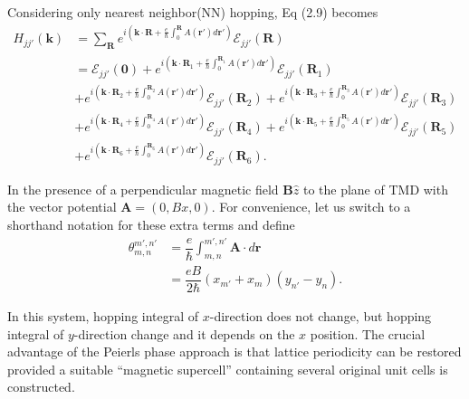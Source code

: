 \documentclass{report}
\newcommand{\f}[2]{\dfrac{#1}{#2}}
\begin{document}
Considering only nearest neighbor(NN) hopping, Eq (2.9) becomes
\begin{equation}
	\begin{aligned}
		H_{jj'}(\mathbf{k})
		 & = \sum_{\mathbf{R}} e^{i(\mathbf{k\cdot R} + \frac{e}{\hbar}\int_{0}^{\mathbf{R}}A(\mathbf{r'})d\mathbf{r'})} \mathcal{E}_{jj'}(\mathbf{R})                                                                                                                                                  \\
		 & = \mathcal{E}_{jj'}(\mathbf{0}) + e^{i(\mathbf{k\cdot}\mathbf{R}_{1} + \frac{e}{\hbar}\int_{0}^{\mathbf{R}_{1}}A(\mathbf{r'})d\mathbf{r'})} \mathcal{E}_{jj'}(\mathbf{R}_{1})                                                                                                                \\
		 & + e^{i(\mathbf{k\cdot} \mathbf{R}_{2} + \frac{e}{\hbar}\int_{0}^{\mathbf{R}_{2}}A(\mathbf{r'})d\mathbf{r'})} \mathcal{E}_{jj'}(\mathbf{R}_{2}) + e^{i(\mathbf{k\cdot}\mathbf{R}_{3} + \frac{e}{\hbar}\int_{0}^{\mathbf{R}_{3}}A(\mathbf{r'})d\mathbf{r'})} \mathcal{E}_{jj'}(\mathbf{R}_{3}) \\
		 & + e^{i(\mathbf{k\cdot}\mathbf{R}_{4} + \frac{e}{\hbar}\int_{0}^{\mathbf{R}_{4}}A(\mathbf{r'})d\mathbf{r'})} \mathcal{E}_{jj'}(\mathbf{R}_{4}) + e^{i(\mathbf{k\cdot}\mathbf{R}_{5} + \frac{e}{\hbar}\int_{0}^{\mathbf{R}_{5}}A(\mathbf{r'})d\mathbf{r'})} \mathcal{E}_{jj'}(\mathbf{R}_{5})  \\
		 & + e^{i(\mathbf{k\cdot}\mathbf{R}_{6} + \frac{e}{\hbar}\int_{0}^{\mathbf{R}_{6}}A(\mathbf{r'})d\mathbf{r'})} \mathcal{E}_{jj'}(\mathbf{R}_{6}).
	\end{aligned}
\end{equation}

In the presence of a perpendicular magnetic field $\mathbf{B} \hat{z}$ to the plane of TMD with the vector potential $\mathbf{A} = (0, Bx, 0)$. For convenience, let us switch to a shorthand notation for these extra terms and define
\begin{equation}
	\begin{aligned}
		\theta_{m,n}^{m',n'}
		 & = \f{e}{\hbar} \int_{m,n}^{m',n'} \mathbf{A} \cdot d\mathbf{r} \\
		 & = \f{eB}{2\hbar}(x_{m'} + x_{m})(y_{n'} - y_{n}).
	\end{aligned}
\end{equation}

In this system, hopping integral of $x$-direction does not change, but hopping integral of $y$-direction change and it depends on the $x$ position. The crucial advantage of the Peierls phase approach is that lattice periodicity can be restored provided a suitable ``magnetic supercell'' containing several original unit cells is constructed.
\end{document}
